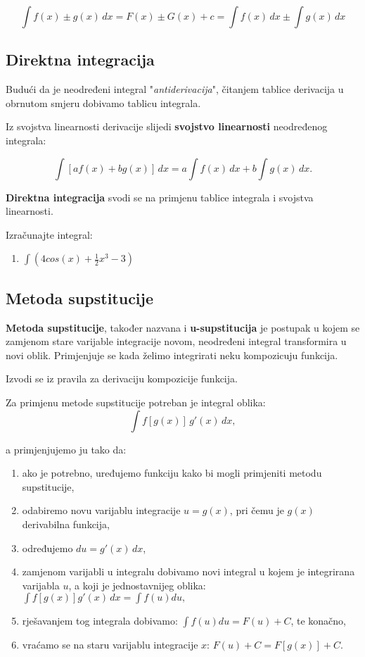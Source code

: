 $$
\int{{f\left( x \right) \pm g\left( x \right)\,dx}} = F\left( x
\right) \pm G\left( x \right) + c = \int{{f\left( x \right)\,dx}} \pm
\int{{g\left( x \right)\,dx}}
$$


\subsection{Direktna integracija}

Budući da je neodređeni integral "\textit{antiderivacija}", čitanjem tablice
derivacija u obrnutom smjeru dobivamo tablicu integrala.

Iz svojstva linearnosti derivacije slijedi \textbf{svojstvo linearnosti}
neodređenog integrala:

$$
\int \left[af(x) + bg(x)\right]\,dx = a \int f(x)\,dx + b \int g(x)\,dx.
$$

\textbf{Direktna integracija} svodi se na primjenu tablice integrala i svojstva
linearnosti.

\begin{example}
    Izračunajte integral:

    \begin{enumerate}
        \item $\displaystyle \int \left(4 cos(x) + \frac{1}{2} x^3 - 3\right)$
    \end{enumerate}
\end{example}

\subsection{Metoda supstitucije}

\textbf{Metoda supstitucije}, također nazvana i \textbf{u-supstitucija} je
postupak u kojem se zamjenom stare varijable integracije novom, neodređeni
integral transformira u novi oblik. Primjenjuje se kada želimo integrirati neku
kompozicuju funkcija.

Izvodi se iz pravila za derivaciju kompozicije funkcija.

\bigskip
\noindent
Za primjenu metode supstitucije potreban je integral oblika:
$$
\int f[g(x)]\,g'(x)\,dx,
$$

\noindent
a primjenjujemo ju tako da:
\begin{enumerate}
    \item ako je potrebno, uređujemo funkciju kako bi mogli primjeniti metodu
    supstitucije,
    \item odabiremo novu varijablu integracije $u = g(x)$, pri čemu je $g(x)$
    derivabilna funkcija,
    \item određujemo $du = g'(x)\,dx$,
    \item zamjenom varijabli u integralu dobivamo novi integral u kojem je
    integrirana varijabla $u$, a koji je jednostavnijeg oblika: $\displaystyle
    \int f[g(x)]g'(x)\,dx = \int f(u)du,$
    \item rješavanjem tog integrala dobivamo: $\displaystyle \int f(u)du = F(u)
    + C$, te konačno,
    \item vraćamo se na staru varijablu integracije $x$: $F(u) + C = F[g(x)] +
    C.$
\end{enumerate}

